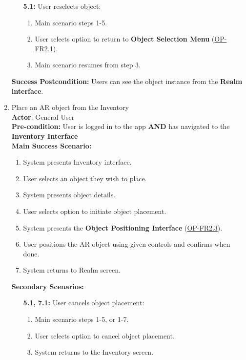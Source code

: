 \documentclass{article}
\begin{document}
\begin{enumerate}[label=\textbf{UC\arabic*}]
\begin{itemize}
              \item[{\bf 5.1:}] User reselects object:
                    \begin{enumerate}[label=\textbf{\arabic*.}]
                        \item Main scenario steps 1-5.
                        \item User selects option to return to \textbf{Object Selection Menu} (\hyperref[ssub:object_placement]{OP-FR2.1}).
                        \item Main scenario resumes from step 3.
                    \end{enumerate}
          \end{itemize}

          \textbf{Success Postcondition:} Users can see the object instance from the \textbf{Realm interface}.

    \item \label{uc:8} Place an AR object from the Inventory \\
          \textbf{Actor}: General User \\
          \textbf{Pre-condition:} User is logged in to the app \textbf{AND} has navigated to the \textbf{Inventory Interface} \\

          \textbf{Main Success Scenario:}
          \begin{enumerate}[label=\textbf{\arabic*.}]
              \item System presents Inventory interface.
              \item User selects an object they wish to place.
              \item System presents object details.
              \item User selects option to initiate object placement.
              \item System presents the \textbf{Object Positioning Interface} (\hyperref[ssub:object_placement]{OP-FR2.3}).
              \item User positions the AR object using given controls and confirms when done.
              \item System returns to Realm screen.
          \end{enumerate}

          \textbf{Secondary Scenarios:}
          \begin{itemize}
              \item[{\bf 5.1, 7.1:}] User cancels object placement:
                    \begin{enumerate}[label=\textbf{\arabic*.}]
                        \item Main scenario steps 1-5, or 1-7.
                        \item User selects option to cancel object placement.
                        \item System returns to the Inventory screen.
                    \end{enumerate}


\end{itemize}
\end{enumerate}
\end{document}

